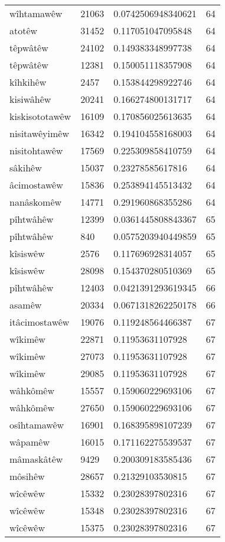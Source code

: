 \begin{longtable}{llll}
wîhtamawêw & 21063 & 0.0742506948340621 & 64\\
atotêw & 31452 & 0.117051047095848 & 64\\
têpwâtêw & 24102 & 0.149383348997738 & 64\\
têpwâtêw & 12381 & 0.150051118357908 & 64\\
kîhkihêw & 2457 & 0.153844298922746 & 64\\
kisiwâhêw & 20241 & 0.166274800131717 & 64\\
kiskisototawêw & 16109 & 0.170856025613635 & 64\\
nisitawêyimêw & 16342 & 0.194104558168003 & 64\\
nisitohtawêw & 17569 & 0.225309858410759 & 64\\
sâkihêw & 15037 & 0.23278585617816 & 64\\
âcimostawêw & 15836 & 0.253894145513432 & 64\\
nanâskomêw & 14771 & 0.291960868355286 & 64\\
pîhtwâhêw & 12399 & 0.0361445808843367 & 65\\
pîhtwâhêw & 840 & 0.0575203940449859 & 65\\
kîsiswêw & 2576 & 0.117696928314057 & 65\\
kîsiswêw & 28098 & 0.154370280510369 & 65\\
pîhtwâhêw & 12403 & 0.0421391293619345 & 66\\
asamêw & 20334 & 0.0671318262250178 & 66\\
itâcimostawêw & 19076 & 0.119248564466387 & 67\\
wîkimêw & 22871 & 0.11953631107928 & 67\\
wîkimêw & 27073 & 0.11953631107928 & 67\\
wîkimêw & 29085 & 0.11953631107928 & 67\\
wâhkômêw & 15557 & 0.159060229693106 & 67\\
wâhkômêw & 27650 & 0.159060229693106 & 67\\
osîhtamawêw & 16901 & 0.168395898107239 & 67\\
wâpamêw & 16015 & 0.171162275539537 & 67\\
mâmaskâtêw & 9429 & 0.200309183585436 & 67\\
môsihêw & 28657 & 0.21329103530815 & 67\\
wîcêwêw & 15332 & 0.23028397802316 & 67\\
wîcêwêw & 15348 & 0.23028397802316 & 67\\
wîcêwêw & 15375 & 0.23028397802316 & 67\\

\end{longtable}
